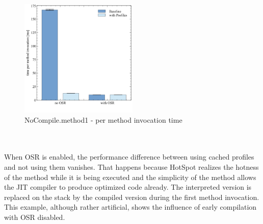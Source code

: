 \begin{figure}[ht]
  \begin{center}
    \centering
    \includegraphics[width=0.5\textwidth]{figures/nocompile.png}
    \caption{NoCompile.method1 - per method invocation time}
    \label{f:nocompile}
  \end{center}
\end{figure}
\\\\
When OSR is enabled, the performance difference between using cached profiles and not using them vanishes.
That happens because HotSpot realizes the hotness of the method while it is being executed and the simplicity of the method allows the JIT compiler to produce optimized code already. The interpreted version is replaced on the stack by the compiled version during the first method invocation. 
This example, although rather artificial, shows the influence of early compilation with OSR disabled.
